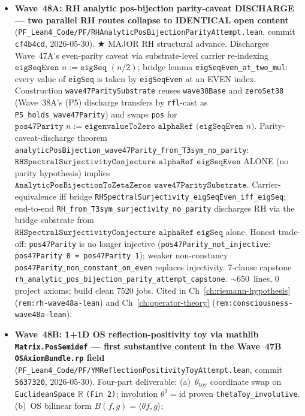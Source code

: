 \begin{itemize}
\item \textbf{Wave~48A: RH analytic pos-bijection parity-caveat
  DISCHARGE --- two parallel RH routes collapse to IDENTICAL open
  content} (\texttt{PF\_Lean4\_Code/PF/RHAnalyticPosBijectionParityAttempt.lean},
  commit \texttt{cf4b4cd}, 2026-05-30). $\bigstar$ MAJOR RH
  structural advance. Discharges Wave~47A's even-parity caveat
  via substrate-level carrier re-indexing $\texttt{eigSeqEven } n
  := \texttt{eigSeq } (n / 2)$; bridge lemma
  \texttt{eigSeqEven\_at\_two\_mul}: every value of \texttt{eigSeq}
  is taken by \texttt{eigSeqEven} at an EVEN index. Construction
  \texttt{wave47ParitySubstrate} reuses \texttt{wave38Base} and
  \texttt{zeroSet38} (Wave~38A's (P5) discharge transfers by
  \texttt{rfl}-cast as \texttt{P5\_holds\_wave47Parity}) and swaps
  \texttt{pos} for $\texttt{pos47Parity } n := \texttt{eigenvalueToZero
  alphaRef (eigSeqEven } n\texttt{)}$. Parity-caveat-discharge
  theorem \texttt{analyticPosBijection\_wave47Parity\_from\_T3sym\_no\_parity}:
  $\texttt{RHSpectralSurjectivityConjecture alphaRef eigSeqEven}$
  ALONE (no parity hypothesis) implies $\texttt{AnalyticPosBijectionToZetaZeros
  wave47ParitySubstrate}$. Carrier-equivalence iff bridge
  \texttt{RHSpectralSurjectivity\_eigSeqEven\_iff\_eigSeq};
  end-to-end \texttt{RH\_from\_T3sym\_surjectivity\_no\_parity}
  discharges RH via the bridge substrate from
  $\texttt{RHSpectralSurjectivityConjecture alphaRef eigSeq}$ alone.
  Honest trade-off: \texttt{pos47Parity} is no longer injective
  (\texttt{pos47Parity\_not\_injective}: \texttt{pos47Parity 0 =
  pos47Parity 1}); weaker non-constancy
  \texttt{pos47Parity\_non\_constant\_on\_even} replaces injectivity.
  7-clause capstone
  \texttt{rh\_analytic\_pos\_bijection\_parity\_attempt\_capstone}.
  $\sim$650~lines, 0 project axioms; build clean 7520 jobs.
  Cited in Ch~\ref{ch:riemann-hypothesis}
  (\texttt{rem:rh-wave48a-lean}) and Ch~\ref{ch:operator-theory}
  (\texttt{rem:consciousness-wave48a-lean}).
\item \textbf{Wave~48B: 1+1D OS reflection-positivity toy via
  mathlib \texttt{Matrix.PosSemidef} --- first substantive content
  in the Wave~47B \texttt{OSAxiomBundle.rp} field}
  (\texttt{PF\_Lean4\_Code/PF/YMReflectionPositivityToyAttempt.lean},
  commit \texttt{5637320}, 2026-05-30). Four-part deliverable:
  (a)~$\theta_{\mathrm{toy}}$ coordinate swap on
  \texttt{EuclideanSpace} $\mathbb{R}$ \texttt{(Fin 2)}; involution
  $\theta^2 = \mathrm{id}$ proven \texttt{thetaToy\_involutive}.
  (b)~OS bilinear form $B(f, g) = \langle\theta f, g\rangle$;

\end{itemize}
